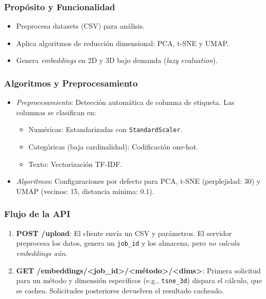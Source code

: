 \documentclass{article}
\begin{document}
\subsubsection{Propósito y Funcionalidad}
\begin{itemize}
    \item Preprocesa datasets (CSV) para análisis.
    \item Aplica algoritmos de reducción dimensional: PCA, t-SNE y UMAP.
    \item Genera \textit{embeddings} en 2D y 3D bajo demanda (\textit{lazy evaluation}).
\end{itemize}

\subsubsection{Algoritmos y Preprocesamiento}
\begin{itemize}
    \item \textit{Preprocesamiento}: Detección automática de columna de etiqueta. Las columnas se clasifican en:
    \begin{itemize}
        \item Numéricas: Estandarizadas con \texttt{StandardScaler}.
        \item Categóricas (baja cardinalidad): Codificación one-hot.
        \item Texto: Vectorización TF-IDF.
    \end{itemize}
    \item \textit{Algoritmos}: Configuraciones por defecto para PCA, t-SNE (perplejidad: 30) y UMAP (vecinos: 15, distancia mínima: 0.1).
\end{itemize}

\subsubsection{Flujo de la API}
\begin{enumerate}
    \item \textbf{POST /upload}: El cliente envía un CSV y parámetros. El servidor preprocesa los datos, genera un \texttt{job\_id} y los almacena, pero \textit{no calcula embeddings aún}.
    \item \textbf{GET /embeddings/<job\_id>/<método>/<dims>}: Primera solicitud para un método y dimensión específicos (e.g., \texttt{tsne\_3d}) dispara el cálculo, que se cachea. Solicitudes posteriores devuelven el resultado cacheado.
\end{enumerate}
\end{document}
